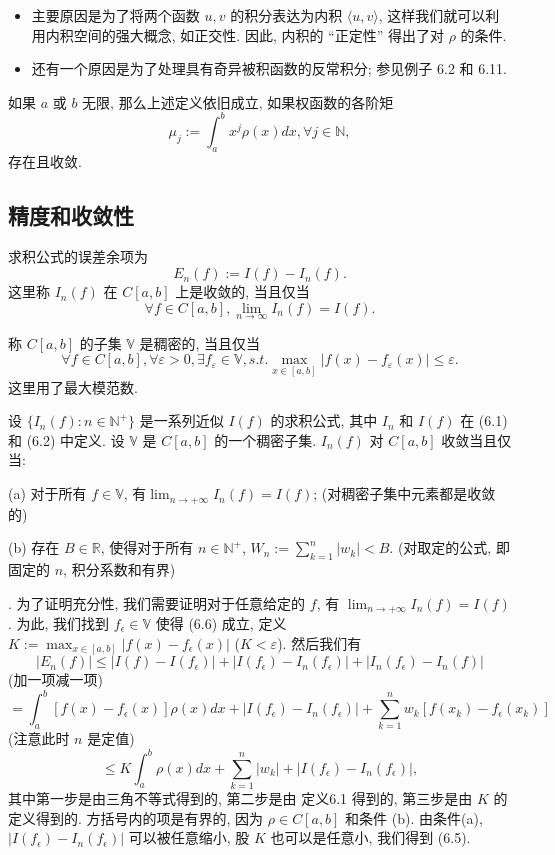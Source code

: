 \documentclass[a4paper]{ctexart}
\newcommand{\hl}[1]
{\noindent {\bf {#1}}}
\begin{document}
\begin{itemize}
  \item 主要原因是为了将两个函数 $u, v$ 的积分表达为内积 $\langle u, v \rangle$, 
  这样我们就可以利用内积空间的强大概念, 如正交性. 因此, 内积的 ``正定性'' 得出了对 $\rho$ 的条件. 
  \item 还有一个原因是为了处理具有奇异被积函数的反常积分; 参见例子 6.2 和 6.11.
\end{itemize}

\hl{例 6.2} 如果 $a$ 或 $b$ 无限, 那么上述定义依旧成立, 如果权函数的各阶矩
$$
\mu_j := \int_a^b x^j \rho(x) dx, \forall j \in \mathbb{N}, 
$$
存在且收敛. 

\subsection{精度和收敛性}
\hl{定义 6.3} 求积公式的误差余项为
$$
E_n(f) := I(f) - I_n(f).
$$
这里称 $I_n(f)$ 在 $C[a, b]$ 上是收敛的, 当且仅当
$$
\forall f \in C[a, b], \lim_{n \to \infty} I_n(f) = I(f).
$$

\hl{定义 6.4} 称 $C[a, b]$ 的子集 $\mathbb{V}$ 是稠密的, 当且仅当
$$
\forall f \in C[a, b], \forall \varepsilon > 0, 
\exists f_\varepsilon \in \mathbb{V}, s. t. 
\max_{x \in [a, b]}\left|f(x) - f_\varepsilon(x)\right| \leq \varepsilon. 
$$
这里用了最大模范数. 

\hl{定理6.5} 设 $\{I_n(f) : n \in \mathbb{N}^+\}$ 是一系列近似 $I(f)$ 的求积公式, 
其中 $I_n$ 和 $I(f)$ 在 (6.1) 和 (6.2) 中定义. 设 $\mathbb{V}$ 是 $C[a, b]$ 的一个稠密子集. 
$I_n(f)$ 对 $C[a, b]$ 收敛当且仅当: 

(a) 对于所有 $f \in \mathbb{V}$, 有$\lim_{n \to +\infty} I_n(f) = I(f)$; 
(对稠密子集中元素都是收敛的)

(b) 存在 $B \in \mathbb{R}$, 使得对于所有 $n \in \mathbb{N}^+$, $W_n := \sum_{k = 1}^{n} |w_k| < B$. 
(对取定的公式, 即固定的 $n$, 积分系数和有界)

\hl{证明}. 为了证明充分性, 我们需要证明对于任意给定的 $f$, 有 $\lim_{n \to +\infty} I_n(f) = I(f)$. 
为此, 我们找到 $f_{\epsilon} \in \mathbb{V}$ 使得 (6.6) 成立, 定义 
$K := \max_{x \in [a,b]} |f(x) - f_{\epsilon}(x)|$ ($K < \varepsilon$). 然后我们有
\[
|E_n(f)| \leq |I(f) - I(f_{\epsilon})| 
+ |I(f_{\epsilon}) - I_n(f_{\epsilon})| + |I_n(f_{\epsilon}) - I_n(f)|
\]
(加一项减一项)
\[
= \int_{a}^{b} [f(x) - f_{\epsilon}(x)] \rho(x)dx + 
|I(f_{\epsilon}) - I_n(f_{\epsilon})| + \sum_{k = 1}^{n} w_k [f(x_k) - f_{\epsilon}(x_k)]
\]
(注意此时 $n$ 是定值)
\[
\leq K \int_{a}^{b} \rho(x)dx + \sum_{k=1}^{n} |w_k| + |I(f_{\epsilon}) - I_n(f_{\epsilon})|,
\]
其中第一步是由三角不等式得到的, 第二步是由 定义6.1 得到的, 第三步是由 $K$ 的定义得到的. 
方括号内的项是有界的, 因为 $\rho \in C[a, b]$ 和条件 (b). 由条件(a), 
$|I(f_{\epsilon}) - I_n(f_{\epsilon})|$ 可以被任意缩小, 股 $K$ 也可以是任意小, 我们得到 (6.5).
\end{document}
